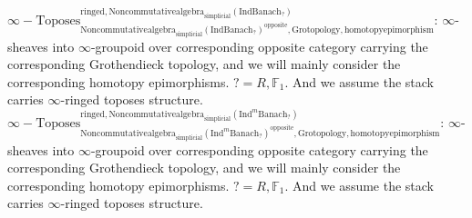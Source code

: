 \documentclass[11pt]{book}
\theoremstyle{definition}
\numberwithin{equation}{section}
\begin{document}
\noindent $\infty-\mathrm{Toposes}^{\mathrm{ringed},\mathrm{Noncommutativealgebra}_{\mathrm{simplicial}}(\mathrm{Ind}\mathrm{Banach}_?)}_{\mathrm{Noncommutativealgebra}_{\mathrm{simplicial}}(\mathrm{Ind}\mathrm{Banach}_?)^\mathrm{opposite},\mathrm{Grotopology,homotopyepimorphism}}$: $\infty$-sheaves into $\infty$-groupoid over corresponding opposite category carrying the corresponding Grothendieck topology, and we will mainly consider the corresponding homotopy epimorphisms. $?=R,\mathbb{F}_1$. And we assume the stack carries $\infty$-ringed toposes structure.\\
\noindent $\infty-\mathrm{Toposes}^{\mathrm{ringed},\mathrm{Noncommutativealgebra}_{\mathrm{simplicial}}(\mathrm{Ind}^m\mathrm{Banach}_?)}_{\mathrm{Noncommutativealgebra}_{\mathrm{simplicial}}(\mathrm{Ind}^m\mathrm{Banach}_?)^\mathrm{opposite},\mathrm{Grotopology,homotopyepimorphism}}$: $\infty$-sheaves into $\infty$-groupoid over corresponding opposite category carrying the corresponding Grothendieck topology, and we will mainly consider the corresponding homotopy epimorphisms. $?=R,\mathbb{F}_1$. And we assume the stack carries $\infty$-ringed toposes structure.\\ 
 
\end{document}

